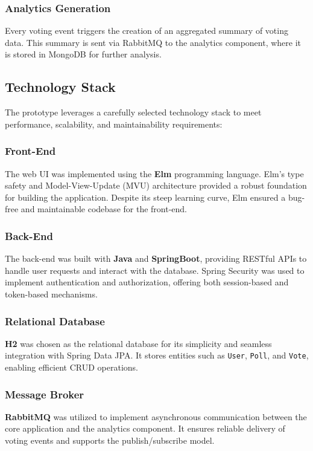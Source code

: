 \subsubsection{Analytics Generation}
Every voting event triggers the creation of an aggregated summary of voting data. This summary is sent via RabbitMQ to the analytics component, where it is stored in MongoDB for further analysis.

\subsection{Technology Stack}
The prototype leverages a carefully selected technology stack to meet performance, scalability, and maintainability requirements:

\subsubsection{Front-End}
The web UI was implemented using the \textbf{Elm} programming language. Elm’s type safety and Model-View-Update (MVU) architecture provided a robust foundation for building the application. Despite its steep learning curve, Elm ensured a bug-free and maintainable codebase for the front-end.

\subsubsection{Back-End}
The back-end was built with \textbf{Java} and \textbf{SpringBoot}, providing RESTful APIs to handle user requests and interact with the database. Spring Security was used to implement authentication and authorization, offering both session-based and token-based mechanisms.

\subsubsection{Relational Database}
\textbf{H2} was chosen as the relational database for its simplicity and seamless integration with Spring Data JPA. It stores entities such as \texttt{User}, \texttt{Poll}, and \texttt{Vote}, enabling efficient CRUD operations.

\subsubsection{Message Broker}
\textbf{RabbitMQ} was utilized to implement asynchronous communication between the core application and the analytics component. It ensures reliable delivery of voting events and supports the publish/subscribe model.

